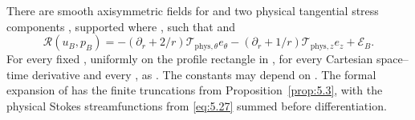 \begin{proposition}\label{prop:5.5}
There are smooth axisymmetric fields  for
 and two physical tangential stress components
, supported where
, such that
 and
\begin{equation}
 \mathscr R(u_B,p_B)
 =-(\partial_r+2/r)\mathcal T_{\mathrm{phys},\theta}e_\theta
  -(\partial_r+1/r)\mathcal T_{\mathrm{phys},z}e_z+\mathcal E_B.
 \tag{5.41}\label{eq:5.41}
\end{equation}
For every fixed , uniformly on the profile rectangle
 in , for every
Cartesian space--time derivative  and every
,
 as
. The constants may depend on
. The formal expansion of
 has the finite truncations
 from Proposition~\ref{prop:5.3}, with the physical Stokes
streamfunctions  from \eqref{eq:5.27} summed before differentiation.


\end{proposition}
